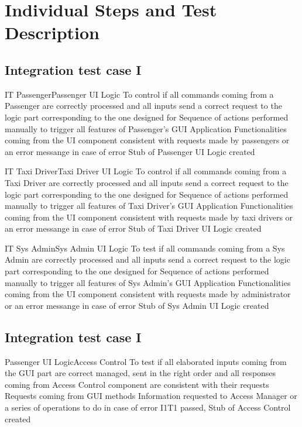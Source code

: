 \newpage
\section{Individual Steps and Test Description}

\subsection{Integration test case I}

\tctable
{IT}
{Passenger\textrightarrow Passenger UI Logic}
{To control if all commands coming from a Passenger are correctly processed and all inputs send a correct request to the logic part corresponding to the one designed for}
{Sequence of actions performed manually to trigger all features of Passenger's GUI Application}
{Functionalities coming from the UI component consistent with requests made by passengers or an error messange in case of error}
{Stub of Passenger UI Logic created}

\vspace{2ex}
\tctable
{IT}
{Taxi Driver\textrightarrow Taxi Driver UI Logic}
{To control if all commands coming from a Taxi Driver are correctly processed and all inputs send a correct request to the logic part corresponding to the one designed for}
{Sequence of actions performed manually to trigger all features of Taxi Driver's GUI Application}
{Functionalities coming from the UI component consistent with requests made by taxi drivers or an error messange in case of error}
{Stub of Taxi Driver UI Logic created}

\vspace{2ex}
\tctable
{IT}
{Sys Admin\textrightarrow Sys Admin UI Logic}
{To test if all commands coming from a Sys Admin are correctly processed and all inputs send a correct request to the logic part corresponding to the one designed for}
{Sequence of actions performed manually to trigger all features of Sys Admin's GUI Application}
{Functionalities coming from the UI component consistent with requests made by administrator or an error messange in case of error}
{Stub of Sys Admin UI Logic created}


\subsection{Integration test case I}
\setcounter{testcounter}{1}
{Passenger UI Logic\textrightarrow Access Control}
{To test if all elaborated inputs coming from the GUI part are correct managed, sent in the right order and all responses coming from Access Control component are consistent with their requests}
{Requests coming from GUI methods}
{Information requested to Access Manager or a series of operations to do in case of error}
{I1T1 passed, Stub of Access Control created}

